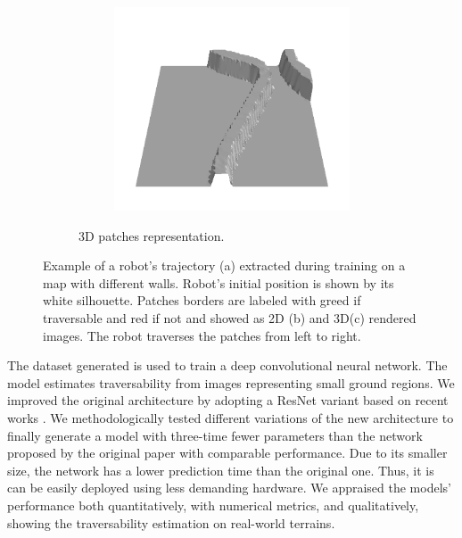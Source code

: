 \documentclass[../document.tex]{subfiles}
\begin{document}
\begin{figure} [htbp]
\begin{subfigure}[b]{1\textwidth}
\begin{subfigure}[b]{0.24\textwidth}
    \includegraphics[width=\linewidth]{../img/bars1-example-patches/3d/14.png}    
    \end{subfigure}  
\caption{3D patches representation.}
\label{fig : patch-extraction}
\end{subfigure}
\caption{Example of a robot's trajectory (a) extracted during training on a map with different walls. Robot's initial position is shown by its white silhouette. Patches borders are labeled with greed if traversable and red if not and showed as 2D (b) and 3D(c) rendered images. The robot traverses the patches from left to right.}
\end{figure}

The dataset generated is used to train a deep convolutional neural network. The model estimates traversability from images representing small ground regions. We improved the original architecture by adopting a ResNet variant based on recent works \cite{he2015deep} \cite{he2015identity} \cite{hu2017squeeze}. We methodologically tested different variations of the new architecture to finally generate a model with three-time fewer parameters than the network proposed by the original paper \cite{omar2018traversability} with comparable performance. Due to its smaller size, the network has a lower prediction time than the original one. Thus, it is can be easily deployed using less demanding hardware. We appraised the models' performance both quantitatively, with numerical metrics, and qualitatively, showing the traversability estimation on real-world terrains.
\end{document}
